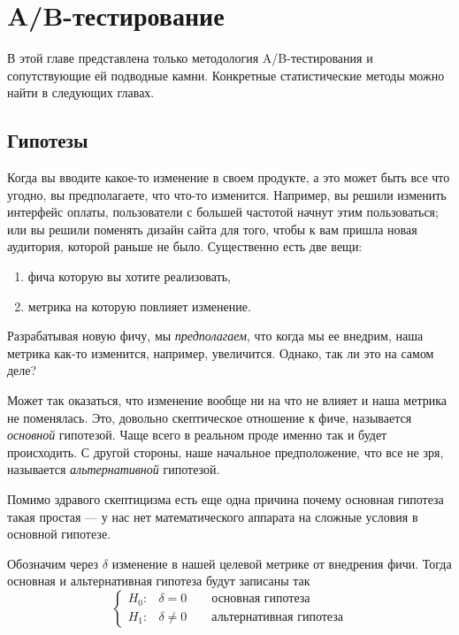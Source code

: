 \documentclass[../handbook.tex]{subfiles}
\begin{document}
\chapter{A\slash B-тестирование}

В этой главе представлена только методология A/B-тестирования и сопутствующие
ей подводные камни. Конкретные статистические методы можно найти в следующих
главах.

\section{Гипотезы}

Когда вы вводите какое-то изменение в своем продукте, а это может быть все что
угодно, вы предполагаете, что что-то изменится. Например, вы решили изменить
интерфейс оплаты, пользователи с большей частотой начнут этим пользоваться; или
вы решили поменять дизайн сайта для того, чтобы к вам пришла новая аудитория,
которой раньше не было. Существенно есть две вещи:
\begin{enumerate}
    \item фича которую вы хотите реализовать,
    \item метрика на которую повлияет изменение.
\end{enumerate}
Разрабатывая новую фичу, мы \emph{предполагаем}, что когда мы ее внедрим, наша
метрика как-то изменится, например, увеличится. Однако, так ли это на самом
деле?

Может так оказаться, что изменение вообще ни на что не влияет и наша метрика не
поменялась. Это, довольно скептическое отношение к фиче, называется
\emph{основной} гипотезой. Чаще всего в реальном проде именно так и будет
происходить. С другой стороны, наше начальное предположение, что все не зря,
называется \emph{альтернативной} гипотезой.

Помимо здравого скептицизма есть еще одна причина почему основная гипотеза такая простая --- у нас нет математического аппарата на сложные условия в основной гипотезе.

Обозначим через $\delta$ изменение в нашей целевой метрике от внедрения фичи. Тогда основная и альтернативная гипотеза будут записаны так
\begin{equation*}
    \begin{cases}
        H_0: & \delta = 0 \qquad\text{основная гипотеза}\\
        H_1: & \delta \ne 0 \qquad\text{альтернативная гипотеза}
    \end{cases}
\end{equation*}
\end{document}
